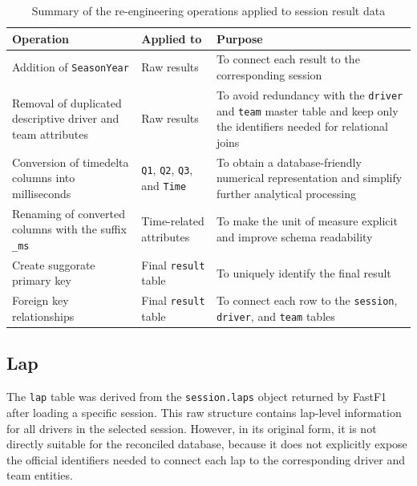 \documentclass[12pt,a4paper]{article}
\begin{document}
	\begin{table}[H]
		\centering
		\caption{Summary of the re-engineering operations applied to session result data}
		\renewcommand{\arraystretch}{1.2}
		\begin{tabularx}{\textwidth}{>{\raggedright\arraybackslash}p{4.1cm} >{\raggedright\arraybackslash}p{3.2cm} >{\raggedright\arraybackslash}X}
			\toprule
			\textbf{Operation} & \textbf{Applied to} & \textbf{Purpose} \\
			\midrule
			Addition of \texttt{SeasonYear} & Raw results & To connect each result to the corresponding session \\
			\addlinespace
			Removal of duplicated descriptive driver and team attributes & Raw results & To avoid redundancy with the \texttt{driver} and \texttt{team} master table and keep only the identifiers needed for relational joins \\
			\addlinespace
			Conversion of timedelta columns into milliseconds & \texttt{Q1}, \texttt{Q2}, \texttt{Q3}, and \texttt{Time} & To obtain a database-friendly numerical representation and simplify further analytical processing \\
			\addlinespace
			Renaming of converted columns with the suffix \texttt{\_ms} & Time-related attributes & To make the unit of measure explicit and improve schema readability \\
			\addlinespace
			Create suggorate primary key & Final \texttt{result} table & To uniquely identify the final result \\
			\addlinespace
			Foreign key relationships & Final \texttt{result} table & To connect each row to the \texttt{session}, \texttt{driver}, and \texttt{team} tables \\
			\bottomrule
		\end{tabularx}
	\end{table}
	
	
	\subsection{Lap}
	
	The \texttt{lap} table was derived from the \texttt{session.laps} object returned by FastF1 after loading a specific session.
	This raw structure contains lap-level information for all drivers in the selected session.
	However, in its original form, it is not directly suitable for the reconciled database, because it does not explicitly expose the official identifiers needed to connect each lap to the corresponding driver and team entities.
	
\end{document}
